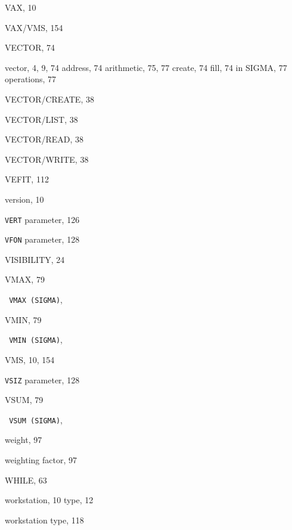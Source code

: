 \begin{theindex}
  \indexspace

  \item VAX, 10
  \item VAX/VMS, 154
  \item {\ttfamily  VECTOR}, 74
  \item vector, 4, 9, 74
    \subitem address, 74
    \subitem arithmetic, 75, 77
    \subitem create, 74
    \subitem fill, 74
    \subitem in SIGMA, 77
    \subitem operations, 77
  \item {\ttfamily  VECTOR/CREATE}, 38
  \item {\ttfamily  VECTOR/LIST}, 38
  \item {\ttfamily  VECTOR/READ}, 38
  \item {\ttfamily  VECTOR/WRITE}, 38
  \item {\ttfamily  VEFIT}, 112
  \item version, 10
  \item {\tt VERT}
     parameter, 126
  \item {\tt VFON}
     parameter, 128
  \item {\ttfamily  VISIBILITY}, 24
  \item {\ttfamily  VMAX}, 79
  \item \texttt  { VMAX{ \textrm {(SIGMA)}}}, 
  \item {\ttfamily  VMIN}, 79
  \item \texttt  { VMIN{ \textrm {(SIGMA)}}}, 
  \item VMS, 10, 154
  \item {\tt VSIZ}
     parameter, 128
  \item {\ttfamily  VSUM}, 79
  \item \texttt  { VSUM \textrm  {(SIGMA)}}, 

  \indexspace

  \item weight, 97
  \item weighting factor, 97
  \item {\ttfamily  WHILE}, 63
  \item workstation, 10
    \subitem type, 12
  \item workstation type, 118

  \indexspace


\end{theindex}
